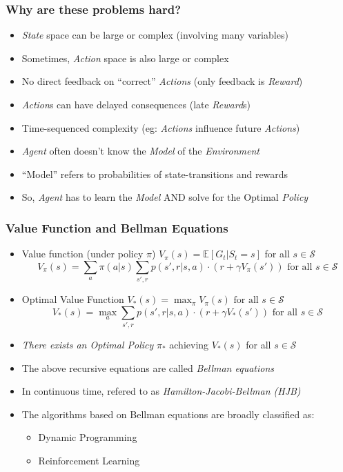 \documentclass[handout]{beamer}
\begin{document}
\begin{frame}
\frametitle{Why are these problems hard?}
\pause
\begin{itemize}[<+->]
\item {\em State} space can be large or complex (involving many variables)
\item Sometimes, {\em Action} space is also large or complex
\item No direct feedback on ``correct'' {\em Actions} (only feedback is {\em Reward})
\item {\em Action}s can have delayed consequences (late {\em Reward}s)
\item Time-sequenced complexity (eg: {\em Actions} influence future {\em Actions})
\item {\em Agent} often doesn't know the {\em Model} of the {\em Environment}
\item ``Model'' refers to probabilities of state-transitions and rewards
\item So, {\em Agent} has to learn the {\em Model} AND solve for the Optimal {\em Policy}
\end{itemize}
\end{frame}

\begin{frame}
\frametitle{Value Function and Bellman Equations}
\pause
\begin{itemize}[<+->]
\item Value function (under policy $\pi$) $V_{\pi}(s) = \mathbb{E}[G_t|S_t = s]$ for all $s \in \mathcal{S}$
$$V_{\pi}(s) = \sum_{a} \pi(a|s) \sum_{s',r} p(s',r|s,a) \cdot (r + \gamma V_{\pi}(s')) \mbox{ for all } s \in \mathcal{S}$$
\item Optimal Value Function $V_{*}(s) = \max_{\pi} V_{\pi}(s) \mbox{ for all } s \in \mathcal{S}$
$$V_{*}(s) = \max_{a} \sum_{s',r} p(s',r|s,a) \cdot (r + \gamma V_{*}(s')) \mbox{ for all } s \in \mathcal{S}$$
\item {\em There exists an Optimal Policy} $\pi_{*}$ achieving $V_{*}(s)$ for all $s \in \mathcal{S}$
\item The above recursive equations are called {\em Bellman equations}
\item In continuous time, refered to as {\em Hamilton-Jacobi-Bellman (HJB)}
\item The algorithms based on Bellman equations are broadly classified as:
\begin{itemize}
\item Dynamic Programming
\item Reinforcement Learning
\end{itemize}
\end{itemize}
\end{frame}
\end{document}
